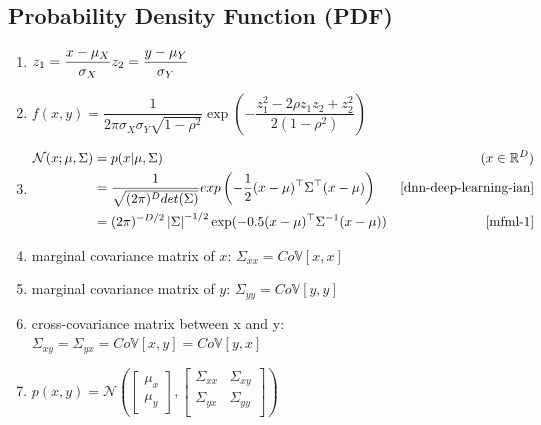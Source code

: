 \subsection{Probability Density Function (PDF) \cite{ism-1,mfml-1}} \label{Normal distribution: Bivariate/ Multivariate: PDF}

\begin{enumerate}[itemsep=0.5cm]
    \item $
        \hfill
        z_1 = \dfrac{x - \mu_X}{\sigma_X}
        \hfill
        z_2 = \dfrac{y - \mu_Y}{\sigma_Y}
        \hfill
    $ \hfill \cite{ism-1}
    
    \item $
        f(x,y)
        = \dfrac{1}{
            2\pi \sigma_X \sigma_Y \sqrt{1 - \rho^2}
        }
        \exp\left(
            -\dfrac{z_1^2 - 2\rho z_1z_2 + z_2^2}{2(1 - \rho^2)}
        \right)
    $ \hfill \cite{ism-1}

    \item $
        \begin{aligned}
        \mathcal{N}(x;\mu,\Sigma)
        &= p(x|\mu, \Sigma) & (x \in \mathbb{R}^D) \\
        &= \dfrac{1}{\sqrt{(2\pi)^D det(\Sigma)}} 
            exp\left(
                -\dfrac{1}{2}(x-\mu)^\top\Sigma^\top(x-\mu)
            \right) & \text{\cite{dnn-deep-learning-ian}} \\
        &= (2\pi)^{-D/2} \left| \Sigma \right|^{-1/2}
            \exp(
                -0.5(x - \mu)^\top\Sigma^{-1}(x - \mu)
            ) & \text{\cite{mfml-1}}
        \end{aligned}
    $ \hfill

    \item marginal covariance matrix of $x$: $
        \Sigma_{xx} = Co\mathbb{V}[x,x]
    $

    \item marginal covariance matrix of $y$: $
        \Sigma_{yy} = Co\mathbb{V}[y,y]
    $

    \item cross-covariance matrix between x and y: $
        \Sigma_{xy} = \Sigma_{yx} = Co\mathbb{V}[x,y] = Co\mathbb{V}[y,x]
    $

    \item $
        p(x,y)
        = \mathcal{N}\left(
            \begin{bmatrix}
                \mu_x \\ \mu_y
            \end{bmatrix},
            \begin{bmatrix}
                \Sigma_{xx} & \Sigma_{xy} \\ 
                \Sigma_{yx} & \Sigma_{yy} \\ 
            \end{bmatrix}
        \right)
    $ \hfill \cite{mfml-1}

\end{enumerate}

